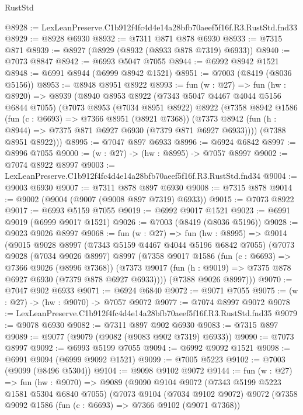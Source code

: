 \begin{lexlean}{RustStd}
\begin{coremodule}
@8928 := LexLeanPreserve.C1b912f4fc4d4e14a28bfb70aeef5f16f.R3.RustStd.fnd33
@8929 := @8928 @6930
@8932 := @7311 @871 @878 @6930
@8933 := @7315 @871
@8939 := @8927 (@8929 (@8932 (@8933 @878 @7319) @6933))
@8940 := @7073 @8847
@8942 := @6993 @5047 @7055
@8944 := @6992 @8942 @1521
@8948 := @6991 @8944 (@6999 @8942 @1521)
@8951 := @7003 (@8419 (@8036 @5156))
@8953 := @8948 @8951 @8922
@8993 := fun (w : @27) =>
  fun (hw : @8920) =>
  @8939
    (@8940
      @8953
      @8922
      (@7343 @5047 @4467 @4044 @5156 @6844 @7055)
      (@7073
        @8953
        (@7034 @8951 @8922)
        @8922
        (@7358
          @8942
          @1586
          (fun (c : @6693) => @7366 @8951 (@8921 @7368))
          (@7373 @8942 (fun (h : @8944) => @7375 @871 @6927 @6930 (@7379 @871 @6927 @6933))))
        (@7388 @8951 @8922)))
@8995 := @7047 @897 @6933
@8996 := @6924 @6842
@8997 := @8996 @7055
@9000 := (w : @27) -> (hw : @8995) -> @7057 @8997
@9002 := @7074 @8922 @8997
@9003 := LexLeanPreserve.C1b912f4fc4d4e14a28bfb70aeef5f16f.R3.RustStd.fnd34
@9004 := @9003 @6930
@9007 := @7311 @878 @897 @6930
@9008 := @7315 @878
@9014 := @9002 (@9004 (@9007 (@9008 @897 @7319) @6933))
@9015 := @7073 @8922
@9017 := @6993 @5159 @7055
@9019 := @6992 @9017 @1521
@9023 := @6991 @9019 (@6999 @9017 @1521)
@9026 := @7003 (@8419 (@8036 @5196))
@9028 := @9023 @9026 @8997
@9068 := fun (w : @27) =>
  fun (hw : @8995) =>
  @9014
    (@9015
      @9028
      @8997
      (@7343 @5159 @4467 @4044 @5196 @6842 @7055)
      (@7073
        @9028
        (@7034 @9026 @8997)
        @8997
        (@7358
          @9017
          @1586
          (fun (c : @6693) => @7366 @9026 (@8996 @7368))
          (@7373 @9017 (fun (h : @9019) => @7375 @878 @6927 @6930 (@7379 @878 @6927 @6933))))
        (@7388 @9026 @8997)))
@9070 := @7047 @902 @6933
@9071 := @6924 @6840
@9072 := @9071 @7055
@9075 := (w : @27) -> (hw : @9070) -> @7057 @9072
@9077 := @7074 @8997 @9072
@9078 := LexLeanPreserve.C1b912f4fc4d4e14a28bfb70aeef5f16f.R3.RustStd.fnd35
@9079 := @9078 @6930
@9082 := @7311 @897 @902 @6930
@9083 := @7315 @897
@9089 := @9077 (@9079 (@9082 (@9083 @902 @7319) @6933))
@9090 := @7073 @8997
@9092 := @6993 @5199 @7055
@9094 := @6992 @9092 @1521
@9098 := @6991 @9094 (@6999 @9092 @1521)
@9099 := @7005 @5223
@9102 := @7003 (@9099 (@8496 @5304))
@9104 := @9098 @9102 @9072
@9144 := fun (w : @27) =>
  fun (hw : @9070) =>
  @9089
    (@9090
      @9104
      @9072
      (@7343 @5199 @5223 @1581 @5304 @6840 @7055)
      (@7073
        @9104
        (@7034 @9102 @9072)
        @9072
        (@7358
          @9092
          @1586
          (fun (c : @6693) => @7366 @9102 (@9071 @7368))

\end{coremodule}
\end{lexlean}
